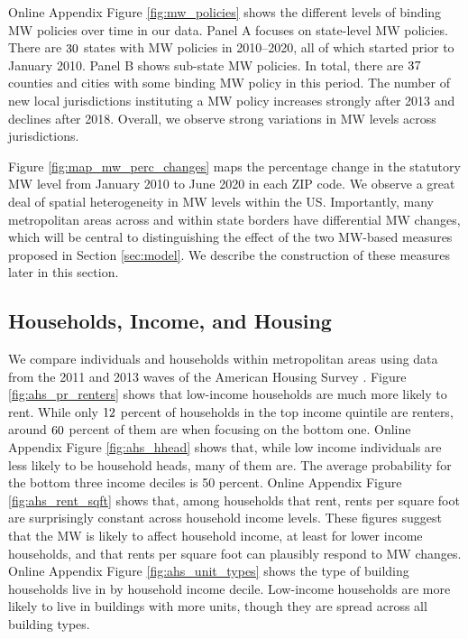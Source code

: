 Online Appendix Figure \ref{fig:mw_policies} shows the different levels of 
binding MW policies over time in our data.
Panel A focuses on state-level MW policies.
There are $\textnormal{30}$ states with MW policies in 2010--2020, all of 
which started prior to January 2010.
Panel B shows sub-state MW policies.
In total, there are $\textnormal{37}$ counties and cities with some binding MW
policy in this period.
The number of new local jurisdictions instituting a MW policy increases strongly 
after 2013 and declines after 2018.
Overall, we observe strong variations in MW levels across jurisdictions.

Figure \ref{fig:map_mw_perc_changes} maps the percentage change in 
the statutory MW level from January 2010 to June 2020 in each ZIP code.
We observe a great deal of spatial heterogeneity in MW levels within the US.
Importantly, many metropolitan areas across and within state borders have 
differential MW changes, which will be central to distinguishing the effect 
of the two MW-based measures proposed in Section \ref{sec:model}.
We describe the construction of these measures later in this section.

\subsection{Households, Income, and Housing}
\label{sec:data_income_housing}

We compare individuals and households within metropolitan areas using data 
from the 2011 and 2013 waves of the American Housing Survey \parencite{ahs2020}.
Figure \ref{fig:ahs_pr_renters} shows that low-income households are much
more likely to rent.
While only $\textnormal{12}$ percent of households in the top income quintile 
are renters, around $\textnormal{60}$ percent of them are when focusing on 
the bottom one.
Online Appendix Figure \ref{fig:ahs_hhead} shows that, while low income 
individuals are less likely to be household heads, many of them are.
The average probability for the bottom three income deciles is 50 percent.
Online Appendix Figure \ref{fig:ahs_rent_sqft} shows that, among households 
that rent, rents per square foot are surprisingly constant across household 
income levels.
These figures suggest that the MW is likely to affect household income, at 
least for lower income households, and that rents per square foot can plausibly
respond to MW changes.
Online Appendix Figure \ref{fig:ahs_unit_types} shows the type of building 
households live in by household income decile.
Low-income households are more likely to live in buildings with more units,
though they are spread across all building types.

